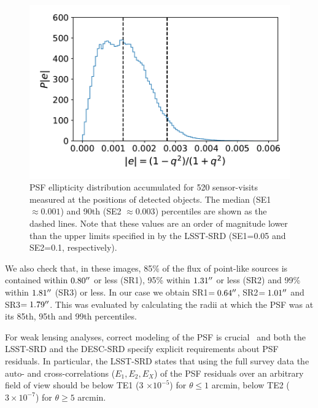 \documentclass[a4paper,fleqn,usenatbib]{mnras}
\begin{document}
\begin{figure}
\centering
\includegraphics[width=0.85\columnwidth]{PSF_ellipticity_DC1}
\caption{PSF ellipticity distribution accumulated for 520 sensor-visits measured at the positions of detected objects. The median (SE1 $\approx 0.001$) and 90th (SE2 $\approx 0.003$) percentiles are shown as the dashed lines. Note that these values are an order of magnitude lower than the upper limits specified in by the LSST-SRD (SE1=0.05 and SE2=0.1, respectively).}
\label{fig:SE1_DC1}
\end{figure}

We also check that, in these images, 85\% of the flux of point-like sources is contained within $0.80\hbox{$^{\prime\prime}$}$ or less (SR1), 95\% within $1.31\hbox{$^{\prime\prime}$}$ or less (SR2) and 99\% within $1.81\hbox{$^{\prime\prime}$}$ (SR3) or less. In our case we obtain SR1$=0.64\hbox{$^{\prime\prime}$}$, SR2$=1.01\hbox{$^{\prime\prime}$}$ and SR3$=1.79\hbox{$^{\prime\prime}$}$. This was evaluated by calculating the radii at which the PSF was at its 85th, 95th and 99th percentiles.

For weak lensing analyses, correct modeling of the PSF is crucial~\citep{2004MNRAS.353..529H} and both the LSST-SRD and the DESC-SRD specify explicit requirements about PSF residuals. In particular, the LSST-SRD states that using the full survey data the auto- and cross-correlations ($E_{1}, E_{2}, E_{X}$) of the PSF residuals over an arbitrary field of view should be below TE1 (3 $\times 10^{-5}$) for $\theta \leq 1$ arcmin, below TE2 ($3 \times 10^{-7}$) for $\theta \geq 5$ arcmin. %
\end{document}
